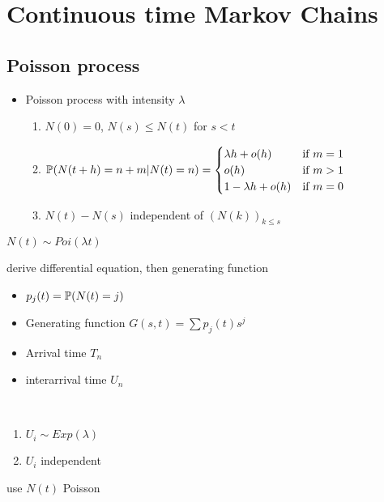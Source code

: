 \section{Continuous time Markov Chains}\label{sec:continous-time-markov-chains}

\subsection{Poisson process}\label{subsec:poisson-process}

\begin{itemize}
    \item Poisson process with intensity $\lambda$
    \begin{enumerate}
        \item $N(0) = 0$, $N(s) \leq N(t)$ for $s < t$
        \item $\mathbb{P}(N(t + h) = n + m| N(t) = n) = \begin{cases}
                                                     \lambda h + o(h) & \text{if } m = 1\\
                                                     o(h) & \text{if } m > 1\\
                                                     1 - \lambda h + o(h) & \text{if } m = 0\\
        \end{cases}$
        \item $N(t) - N(s)$ independent of $(N(k))_{k \leq s}$
    \end{enumerate}
\end{itemize}

\begin{thm}
    $N(t) \sim Poi(\lambda t)$
\end{thm}
\begin{pf}
    derive differential equation, then generating function
\end{pf}

\begin{itemize}
    \item $p_j(t) = \mathbb{P}(N(t) = j)$
    \item Generating function $G(s, t) = \sum p_j(t)s^j$
    \item Arrival time $T_n$
    \item interarrival time $U_n$
\end{itemize}

\begin{thm}\,
    \begin{enumerate}
        \item $U_i \sim Exp(\lambda)$
        \item $U_i$ independent
    \end{enumerate}
\end{thm}
\begin{pf}
    use $N(t)$ Poisson
\end{pf}

